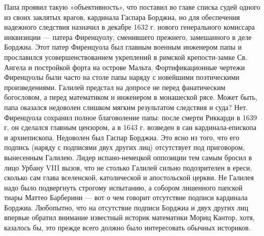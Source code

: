 Папа проявил такую «объективность», что поставил во главе списка судей одного
из своих заклятых врагов, кардинала Гаспара Борджиа, но для обеспечения
надежного следствия назначил в декабре 1632 г. нового генерального комиссара
инквизиции --- патера Фиренцуолу, сменившего прежнего, замешанного в деле
Борджиа. Этот патер Фиренцуола был главным военным инженером папы и прославился
усовершенствованием укреплений в римской крепости-замке Св. Ангела и постройкой
форта на острове Мальта. Фортификационные чертежи Фиренцуолы были часто на
столе папы наряду с новейшими поэтическими произведениями. Галилей предстал на
допросе не перед фанатическим богословом, а перед математиком и инженером в
монашеской рясе. Может быть, папа оказался недоволен слишком мягким результатом
следствия и суда? Нет. Фиренцуола сохранил полное благоволение папы: после
смерти Риккарди в 1639 г. он сделался главным цензором, а в 1643 г. возведен в
сан кардинала-епископа и архиепископа. Недоволен был Гаспар Борджиа. Это ясно
из того, что его подпись (наряду с подписями двух других лиц) отсутствует под
приговором, вынесенным Галилею. Лидер испано-немецкой оппозиции тем самым
бросил в лицо Урбану VIII вызов, что не столько Галилей сильно подозрителен в
ереси, сколько сам глава вселенской, католической и апостольской церкви. Не
Галилея надо было подвергнуть строгому испытанию, а собором лишенного папской
тиары Маттео Барберини --- вот о чем говорит отсутствие подписи кардинала
Борджиа. Любопытно, что на отсутствие подписи Борджиа и двух других лиц впервые
обратил внимание известный историк математики Мориц Кантор, хотя, казалось бы,
это прежде всего должно было интересовать обычных историков.

